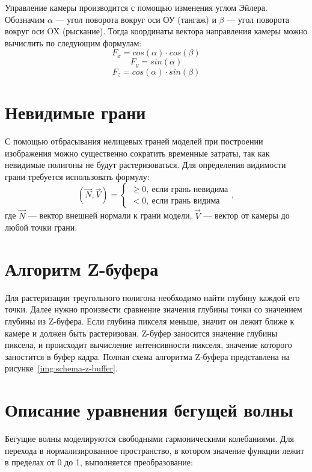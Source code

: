 Управление камеры производится с помощью изменения углом Эйлера.
Обозначим $\alpha$ --- угол поворота вокруг оси ОУ (тангаж) и  $\beta$ --- угол поворота вокруг оси OX (рыскание).
Тогда координаты вектора направления камеры можно вычислить по следующим формулам:
\begin{equation}
	F_x = cos(\alpha) \cdot cos(\beta)
\end{equation}
\begin{equation}
	F_y = sin(\alpha)
\end{equation}
\begin{equation}
	F_z = cos(\alpha) \cdot sin(\beta)
\end{equation}

\section{Невидимые грани}
С помощью отбрасывания нелицевых граней моделей при построении изображения можно существенно сократить временные затраты, так как невидимые полигоны не будут растеризоваться.
Для определения видимости грани требуется использовать формулу:
\begin{equation}
	(\overrightarrow{N}, \overrightarrow{V}) = \begin{cases}
		 \geq 0,~\text{если грань невидима} \\
		 < 0,~\text{если грань видима}
	\end{cases},
\end{equation}
где $\overrightarrow{N}$ --- вектор внешней нормали к грани модели, $\overrightarrow{V}$ --- вектор от камеры до любой точки грани.

\section{Алгоритм Z-буфера}
Для растеризации треугольного полигона необходимо найти глубину каждой его точки.
Далее нужно произвести сравнение значения глубины точки со значением глубины из Z-буфера. 
Если глубина пикселя меньше, значит он лежит ближе к камере и должен быть растеризован, 
Z-буфер заносится значение глубины пиксела, и происходит вычисление интенсивности пикселя, значение которого заностится в буфер кадра. 
Полная схема алгоритма Z-буфера представлена на рисунке~\ref{img:schema-z-buffer}.


\newpage

\section{Описание уравнения бегущей волны}
Бегущие волны моделируются свободными гармоническими колебаниями. 
Для перехода в нормализированное пространство, в котором значение функции лежит в пределах от 0 до 1, 
выполняется преобразование:

